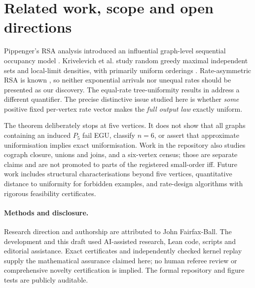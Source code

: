 \documentclass[11pt,a4paper]{article}
\begin{document}
\section{Related work, scope and open directions}
Pippenger's RSA analysis introduced an influential graph-level sequential occupancy model \citep{Pippenger1989}.  Krivelevich et al. study random greedy maximal independent sets and local-limit densities, with primarily uniform orderings \citep{Krivelevich2024}.  Rate-asymmetric RSA is known \citep{PenroseRosoman2012}, so neither exponential arrivals nor unequal rates should be presented as our discovery.  The equal-rate tree-uniformity results in \citet{FairfaxBall2026} address a different quantifier.  The precise distinctive issue studied here is whether \emph{some} positive fixed per-vertex rate vector makes the \emph{full output law} exactly uniform.

The theorem deliberately stops at five vertices.  It does not show that all graphs containing an induced $P_5$ fail EGU, classify $n=6$, or assert that approximate uniformisation implies exact uniformisation.  Work in the repository also studies cograph closure, unions and joins, and a six-vertex census; those are separate claims and are not promoted to parts of the registered small-order iff.  Future work includes structural characterisations beyond five vertices, quantitative distance to uniformity for forbidden examples, and rate-design algorithms with rigorous feasibility certificates.

\paragraph{Methods and disclosure.} Research direction and authorship are attributed to John Fairfax-Ball.  The development and this draft used AI-assisted research, Lean code, scripts and editorial assistance.  Exact certificates and independently checked kernel replay supply the mathematical assurance claimed here; no human referee review or comprehensive novelty certification is implied.  The formal repository and figure tests are publicly auditable.

\appendix
\sloppy
\end{document}

